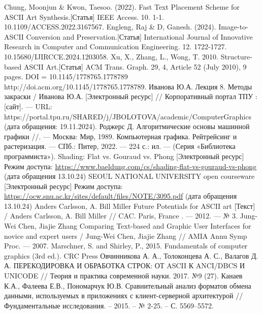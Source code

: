 \begin{thebibliography}{}
     Chung, Moonjun \& Kwon, Taesoo. (2022). Fast Text Placement Scheme for ASCII Art Synthesis.[Статья] IEEE Access. 10. 1-1. 10.1109/ACCESS.2022.3167567.
     Engleng, Raj \& D, Ganesh. (2024). Image-to-ASCII Conversion and Preservation.[Статья] International Journal of Innovative Research in Computer and Communication Engineering. 12. 1722-1727. 10.15680/IJIRCCE.2024.1203058.
     Xu, X., Zhang, L., Wong, T. 2010. Structure-based ASCII Art.[Статья] ACM Trans. Graph. 29, 4, Article 52 (July 2010), 9 pages. DOI = 10.1145/1778765.1778789 http://doi.acm.org/10.1145/1778765.1778789.
     Иванова Ю.А. Лекция 8. Методы закраски / Иванова Ю.А. [Электронный ресурс] // Корпоративный портал ТПУ : [сайт]. — URL: https://portal.tpu.ru/SHARED/j/JBOLOTOVA/academic/ComputerGraphics (дата обращения: 19.11.2024).
     Роджерс Д. Алгоритмические основы машинной графики //. — Москва: Мир, 1989.
     Компьютерная графика. Рейтрейсинг и растеризация. — СПб.: Питер, 2022. — 224 с.: ил. — (Серия «Библиотека программиста»).
     Shading: Flat vs. Gouraud vs. Phong [Электронный ресурс] Режим доступа: \url{https://www.baeldung.com/cs/shading-flat-vs-gouraud-vs-phong} (дата обращения 13.10.24)
     SEOUL NATIONAL UNIVERSITY open courseware [Электронный ресурс] Режим доступа: \url{https://ocw.snu.ac.kr/sites/default/files/NOTE/3095.pdf} (дата обращения 13.10.24)
     Anders Carlsson, A. Bill Miller  Future Potentials for ASCII art  [Текст] / Anders Carlsson, A. Bill Miller  // CAC. Paris, France . — 2012. — № 3.
     Jung-Wei Chen, Jiajie Zhang Comparing Text-based and Graphic User Interfaces for novice and expert users / Jung-Wei Chen, Jiajie Zhang // AMIA Annu Symp Proc. — 2007.
     Marschner, S. and Shirley, P., 2015. Fundamentals of computer graphics (3rd ed.). CRC Press
     Овчинникова А. А., Толоконцева А. С., Валагов Д. А. ПЕРЕКОДИРОВКА И ОБРАБОТКА СТРОК: ОТ ASCII К ANCI/DBCS И UNICODE // Теория и практика современной науки. 2017. №9 (27).
     Канаев К.А., Фалеева Е.В., Пономарчук Ю.В. Сравнительный анализ форматов обмена данными, используемых в приложениях с клиент-серверной архитектурой // Фундаментальные исследования. – 2015. – № 2-25. – С. 5569–5572.

\end{thebibliography}

